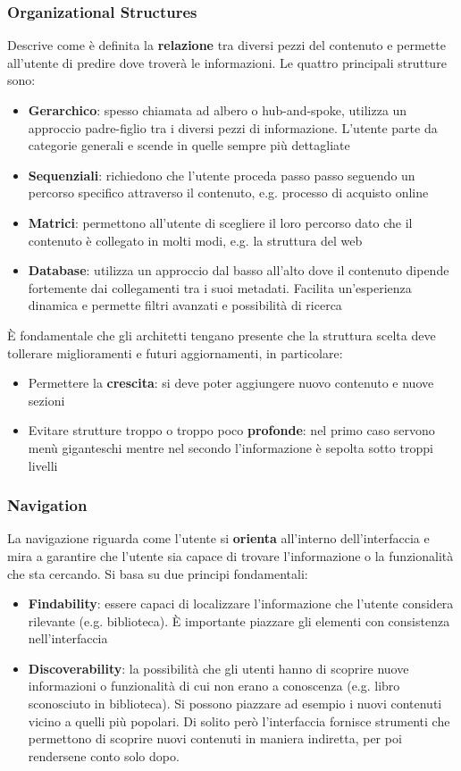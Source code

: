 \subsubsection{Organizational Structures}
Descrive come è definita la \textbf{relazione} tra diversi pezzi del contenuto e permette all'utente di predire dove troverà le informazioni. Le quattro principali strutture sono:
\begin{itemize}
	\item \textbf{Gerarchico}: spesso chiamata ad albero o hub-and-spoke, utilizza un approccio padre-figlio tra i diversi pezzi di informazione. L'utente parte da categorie generali e scende in quelle sempre più dettagliate
	\item \textbf{Sequenziali}: richiedono che l'utente proceda passo passo seguendo un percorso specifico attraverso il contenuto, e.g. processo di acquisto online
	\item \textbf{Matrici}: permettono all'utente di scegliere il loro percorso dato che il contenuto è collegato in molti modi, e.g. la struttura del web
	\item \textbf{Database}: utilizza un approccio dal basso all'alto dove il contenuto dipende fortemente dai collegamenti tra i suoi metadati. Facilita un'esperienza dinamica e permette filtri avanzati e possibilità di ricerca
\end{itemize}
È fondamentale che gli architetti tengano presente che la struttura scelta deve tollerare miglioramenti e futuri aggiornamenti, in particolare:
\begin{itemize}
	\item Permettere la \textbf{crescita}: si deve poter aggiungere nuovo contenuto e nuove sezioni
	\item Evitare strutture troppo o troppo poco \textbf{profonde}: nel primo caso servono menù giganteschi mentre nel secondo l'informazione è sepolta sotto troppi livelli
\end{itemize}

\subsubsection{Navigation}
La navigazione riguarda come l'utente si \textbf{orienta} all'interno dell'interfaccia e mira a garantire che l'utente sia capace di trovare l'informazione o la funzionalità che sta cercando. Si basa su due principi fondamentali:
\begin{itemize}
	\item \textbf{Findability}: essere capaci di localizzare l'informazione che l'utente considera rilevante (e.g. biblioteca). È importante piazzare gli elementi con consistenza nell'interfaccia
	\item \textbf{Discoverability}: la possibilità che gli utenti hanno di scoprire nuove informazioni o funzionalità di cui non erano a conoscenza (e.g. libro sconosciuto in biblioteca). Si possono piazzare ad esempio i nuovi contenuti vicino a quelli più popolari. Di solito però l'interfaccia fornisce strumenti che permettono di scoprire nuovi contenuti in maniera indiretta, per poi rendersene conto solo dopo.
\end{itemize}
